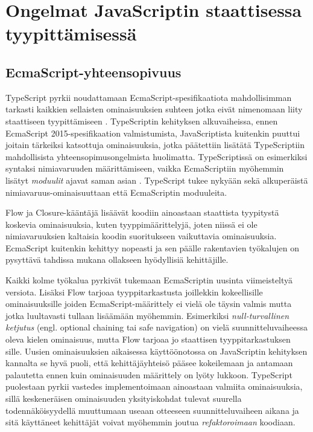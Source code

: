 \chapter{Ongelmat JavaScriptin staattisessa tyypittämisessä}

\section{EcmaScript-yhteensopivuus}
TypeScript pyrkii noudattamaan EcmaScript-spesifikaatiota mahdollisimman
tarkasti kaikkien sellaisten ominaisuuksien suhteen jotka eivät nimenomaan
liity staattiseen tyypittämiseen \cite{TypeScript_DesignGoals}. TypeScriptin
kehityksen alkuvaiheissa, ennen EcmaScript 2015-spesifikaation valmistumista,
JavaScriptista kuitenkin puuttui joitain tärkeiksi katsottuja ominaisuuksia,
jotka päätettiin lisätätä TypeScriptiin mahdollisista yhteensopimusongelmista
huolimatta. TypeScriptissä on esimerkiksi syntaksi nimiavaruuden määrittämiseen,
vaikka EcmaScriptiin myöhemmin lisätyt \textit{moduulit} ajavat saman asian
\cite{TypeScript_issuecomment_esnextfeatures}. TypeScript tukee nykyään sekä
alkuperäistä nimiavaruus-ominaisuuttaan että EcmaScriptin moduuleita.

Flow ja Closure-kääntäjä lisäävät koodiin ainoastaan staattista tyypitystä
koskevia ominaisuuksia, kuten tyyppimäärittelyjä, joten niissä ei ole
nimiavaruuksien kaltaisia koodin suoritukseen vaikuttavia ominaisuuksia.
EcmaScript kuitenkin kehittyy nopeasti ja sen päälle rakentavien työkalujen
on pysyttävä tahdissa mukana ollakseen hyödyllisiä kehittäjille.

Kaikki kolme työkalua pyrkivät tukemaan EcmaScriptin uusinta viimeisteltyä
versiota. Lisäksi Flow tarjoaa tyyppitarkastusta joillekkin kokeellisille
ominaisuuksille joiden EcmaScript-määrittely ei vielä ole täysin valmis mutta
jotka luultavasti tullaan lisäämään myöhemmin. Esimerkiksi
\textit{null-turvallinen ketjutus} (engl. optional chaining tai safe navigation)
\cite{Optional_Chaining_proposal} on vielä
suunnitteluvaiheessa oleva kielen ominaisuus, mutta Flow tarjoaa jo
staattisen tyyppitarkastuksen sille. Uusien ominaisuuksien aikaisessa
käyttöönotossa on JavaScriptin kehityksen kannalta se hyvä puoli, että
kehittäjäyhteisö pääsee kokeilemaan ja antamaan palautetta ennen kuin ominaisuuden
määrittely on lyöty lukkoon. TypeScript puolestaan pyrkii vastedes implementoimaan
ainoastaan valmiita ominaisuuksia, sillä keskeneräisen ominaisuuden yksityiskohdat
tulevat suurella todennäköisyydellä muuttumaan useaan otteeseen suunnitteluvaiheen
aikana ja sitä käyttäneet kehittäjät voivat myöhemmin joutua
\textit{refaktoroimaan} koodiaan.

